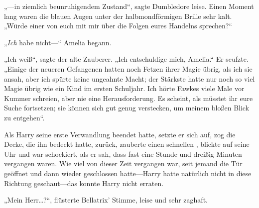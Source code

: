 „—in ziemlich beunruhigendem Zustand“, sagte Dumbledore leise. Einen Moment lang waren die blauen Augen unter der halbmondförmigen Brille sehr kalt. „Würde einer von euch mit mir über die Folgen eures Handelns sprechen?“

„\emph{Ich} habe nicht—“ Amelia begann.

„Ich weiß“, sagte der alte Zauberer. „Ich entschuldige mich, Amelia.“ Er seufzte. „Einige der neueren Gefangenen hatten noch Fetzen ihrer Magie übrig, als ich sie ansah, aber ich spürte keine ungeahnte Macht; der Stärkste hatte nur noch so viel Magie übrig wie ein Kind im ersten Schuljahr. Ich hörte Fawkes viele Male vor Kummer schreien, aber nie eine Herausforderung. Es scheint, als müsstet ihr eure Suche fortsetzen; sie können sich gut genug verstecken, um meinem bloßen Blick zu entgehen“.

\later

Als Harry seine erste Verwandlung beendet hatte, setzte er sich auf, zog die Decke, die ihn bedeckt hatte, zurück, zauberte einen schnellen , blickte auf seine Uhr und war schockiert, als er sah, dass fast eine Stunde und dreißig Minuten vergangen waren. Wie viel von dieser Zeit vergangen war, seit jemand die Tür geöffnet und dann wieder geschlossen hatte—Harry hatte natürlich nicht in diese Richtung geschaut—das konnte Harry nicht erraten.

„Mein Herr…?“, flüsterte Bellatrix’ Stimme, leise und sehr zaghaft.

